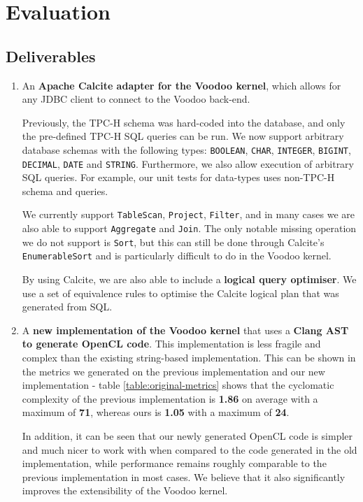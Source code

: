 \chapter{Evaluation}

\section{Deliverables}

\begin{enumerate}
    \item An \textbf{Apache Calcite adapter for the Voodoo kernel}, which allows for any JDBC client to connect to the Voodoo back-end.
    
    Previously, the TPC-H schema was hard-coded into the database, and only the pre-defined TPC-H SQL queries can be run. We now support arbitrary database schemas with the following types: \texttt{BOOLEAN}, \texttt{CHAR}, \texttt{INTEGER}, \texttt{BIGINT}, \texttt{DECIMAL}, \texttt{DATE} and \texttt{STRING}. Furthermore, we also allow execution of arbitrary SQL queries. For example, our unit tests for data-types uses non-TPC-H schema and queries.
    
    We currently support \texttt{TableScan}, \texttt{Project}, \texttt{Filter}, and in many cases we are also able to support \texttt{Aggregate} and \texttt{Join}. The only notable missing operation we do not support is \texttt{Sort}, but this can still be done through Calcite's \texttt{EnumerableSort} and is particularly difficult to do in the Voodoo kernel.
    
    By using Calcite, we are also able to include a \textbf{logical query optimiser}. We use a set of equivalence rules to optimise the Calcite logical plan that was generated from SQL.
    
    \item A \textbf{new implementation of the Voodoo kernel} that uses a \textbf{Clang AST to generate OpenCL code}. This implementation is less fragile and complex than the existing string-based implementation. This can be shown in the metrics we generated on the previous implementation and our new implementation - table \ref{table:original-metrics} shows that the cyclomatic complexity of the previous implementation is \textbf{1.86} on average with a maximum of \textbf{71}, whereas ours is \textbf{1.05} with a maximum of \textbf{24}.
    
    In addition, it can be seen that our newly generated OpenCL code is simpler and much nicer to work with when compared to the code generated in the old implementation, while performance remains roughly comparable to the previous implementation in most cases. We believe that it also significantly improves the extensibility of the Voodoo kernel.
    

\end{enumerate}
